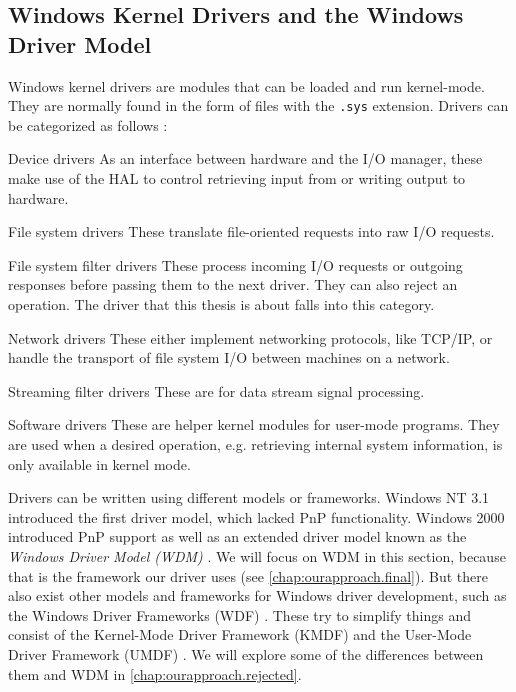 \subsection{Windows Kernel Drivers and the Windows Driver Model}
\label{chap:background.kerneldriver.wdm}
Windows kernel drivers are modules that can be loaded and run kernel-mode. They are normally found in the form of files with the \texttt{.sys} extension. Drivers can be categorized as follows \cite{Yosifovich2017}:
\begin{descitemize}
	\item[Device drivers] As an interface between hardware and the I/O manager, these make use of the HAL to control retrieving input from or writing output to hardware.
	\item[File system drivers] These translate file-oriented requests into raw I/O requests.
	\item[File system filter drivers] These process incoming I/O requests or outgoing responses before passing them to the next driver. They can also reject an operation. The driver that this thesis is about falls into this category.
	\item[Network drivers] These either implement networking protocols, like TCP/IP, or handle the transport of file system I/O between machines on a network.
	\item[Streaming filter drivers] These are for data stream signal processing.
	\item[Software drivers] These are helper kernel modules for user-mode programs. They are used when a desired operation, e.g. retrieving internal system information, is only available in kernel mode.
\end{descitemize}

Drivers can be written using different models or frameworks. Windows NT 3.1 introduced the first driver model, which lacked PnP functionality. Windows 2000 introduced PnP support as well as an extended driver model known as the \emph{Windows Driver Model (WDM)} \cite{Yosifovich2017}. We will focus on WDM in this section, because that is the framework our driver uses (see \autoref{chap:ourapproach.final}). But there also exist other models and frameworks for Windows driver development, such as the Windows Driver Frameworks (WDF) \cite{Wdf}. These try to simplify things and consist of the Kernel-Mode Driver Framework (KMDF) and the User-Mode Driver Framework (UMDF) \cite{Yosifovich2017}. We will explore some of the differences between them and WDM in \autoref{chap:ourapproach.rejected}.

